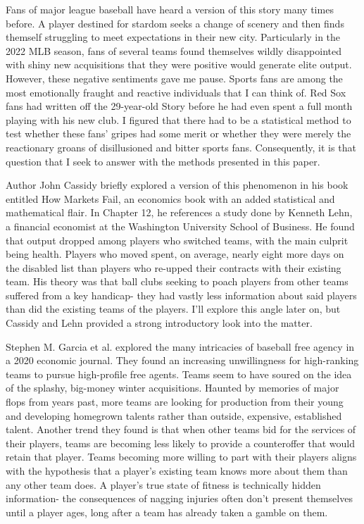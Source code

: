 \documentclass[10pt]{article}
\begin{document}
Fans of major league baseball have heard a version of this story many times before. A player destined for stardom seeks a 
change of scenery and then finds themself struggling to meet expectations in their new city. Particularly in the 2022 MLB 
season, fans of several teams found themselves wildly disappointed with shiny new acquisitions that they were positive would 
generate elite output. However, these negative sentiments gave me pause. Sports fans are among the most emotionally fraught 
and reactive individuals that I can think of. Red Sox fans had written off the 29-year-old Story before he had even spent a 
full month playing with his new club. I figured that there had to be a statistical method to test whether these fans’ gripes 
had some merit or whether they were merely the reactionary groans of disillusioned and bitter sports fans. Consequently, it 
is that question that I seek to answer with the methods presented in this paper. 

Author John Cassidy briefly explored a version of this phenomenon in his book entitled How Markets Fail, an economics book with 
an added statistical and mathematical flair. In Chapter 12, he references a study done by Kenneth Lehn, a financial economist 
at the Washington University School of Business. He found that output dropped among players who switched teams, with the main 
culprit being health. Players who moved spent, on average, nearly eight more days on the disabled list than players who re-upped 
their contracts with their existing team. His theory was that ball clubs seeking to poach players from other teams suffered from 
a key handicap- they had vastly less information about said players than did the existing teams of the players. I’ll explore 
this angle later on, but Cassidy and Lehn provided a strong introductory look into the matter. 

Stephen M. Garcia et al. explored the many intricacies of baseball free agency in a 2020 economic journal. They found an 
increasing unwillingness for high-ranking teams to pursue high-profile free agents. Teams seem to have soured on the 
idea of the splashy, big-money winter acquisitions. Haunted by memories of major flops from years past, more teams are looking 
for production from their young and developing homegrown talents rather than outside, expensive, established talent. Another 
trend they found is that when other teams bid for the services of their players, teams are becoming less likely to provide a 
counteroffer that would retain that player. Teams becoming more willing to part with their players aligns with the hypothesis 
that a player’s existing team knows more about them than any other team does. A player’s true state of fitness is technically 
hidden information- the consequences of nagging injuries often don’t present themselves until a player ages, long after a team 
has already taken a gamble on them.
\end{document}
